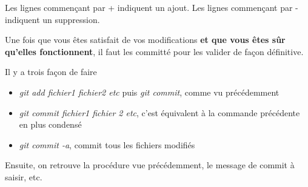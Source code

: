 \documentclass[a4paper]{article}
\begin{document}
Les lignes commençant par + indiquent un ajout. Les lignes commençant par - indiquent un suppression.

Une fois que vous êtes satisfait de vos modifications \textbf{et que vous êtes sûr qu'elles fonctionnent}, il faut les committé pour les valider de façon définitive.

Il y a trois façon de faire

\begin{itemize}
\item \emph{git add fichier1 fichier2 etc} puis \emph{git commit}, comme vu précédemment 
\item \emph{git commit fichier1 fichier 2 etc}, c'est équivalent à la commande précédente en plus condensé
\item \emph{git commit -a}, commit tous les fichiers modifiés
\end{itemize}

Ensuite, on retrouve la procédure vue précédemment, le message de commit à saisir, etc.
\end{document}
